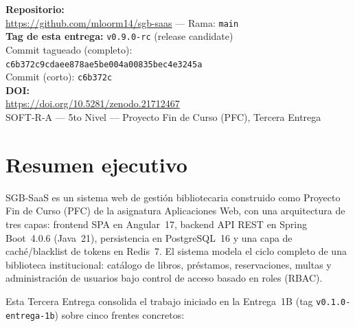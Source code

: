 \documentclass[12pt,a4paper]{article}
\begin{document}
\begin{titlepage}
{\normalsize\bfseries Repositorio:}\\
\url{https://github.com/mloorm14/sgb-saas} \quad --- \quad Rama: \texttt{main}\\[0.5cm]

{\normalsize\bfseries Tag de esta entrega:} \texttt{v0.9.0-rc} (release candidate)\\[0.2cm]
{\small Commit tagueado (completo):}\\
{\small\texttt{c6b372c9cdaee878ae5be004a00835bec4e3245a}}\\[0.1cm]
{\small Commit (corto): \texttt{c6b372c}}\\[0.5cm]

{\normalsize\bfseries DOI:}\\
{\small \url{https://doi.org/10.5281/zenodo.21712467}}\\[1cm]

\vfill
{\small SOFT-R-A --- 5to Nivel --- Proyecto Fin de Curso (PFC), Tercera Entrega}
\end{titlepage}

\tableofcontents
\newpage

\section{Resumen ejecutivo}

SGB-SaaS es un sistema web de gestión bibliotecaria construido como
Proyecto Fin de Curso (PFC) de la asignatura Aplicaciones Web, con una
arquitectura de tres capas: frontend SPA en Angular~17, backend API REST
en Spring Boot~4.0.6 (Java~21), persistencia en PostgreSQL~16 y una capa
de caché/blacklist de tokens en Redis~7. El sistema modela el ciclo
completo de una biblioteca institucional: catálogo de libros, préstamos,
reservaciones, multas y administración de usuarios bajo control de
acceso basado en roles (RBAC).

Esta Tercera Entrega consolida el trabajo iniciado en la Entrega~1B
(tag \texttt{v0.1.0-entrega-1b}) sobre cinco frentes concretos:
\end{document}

